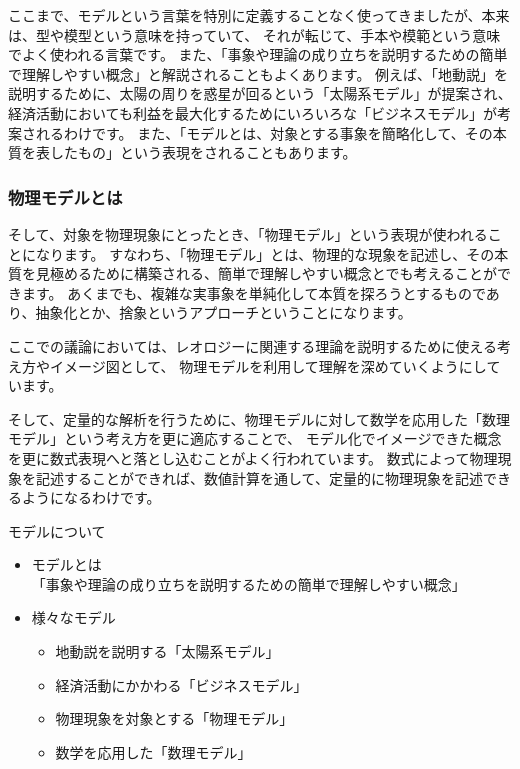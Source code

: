 \documentclass[uplatex,dvipdfmx,a4paper,11pt]{jsarticle}
\begin{document}
ここまで、モデルという言葉を特別に定義することなく使ってきましたが、本来は、型や模型という意味を持っていて、
それが転じて、手本や模範という意味でよく使われる言葉です。
また、「事象や理論の成り立ちを説明するための簡単で理解しやすい概念」と解説されることもよくあります。
例えば、「地動説」を説明するために、太陽の周りを惑星が回るという「太陽系モデル」が提案され、
経済活動においても利益を最大化するためにいろいろな「ビジネスモデル」が考案されるわけです。
また、「モデルとは、対象とする事象を簡略化して、その本質を表したもの」という表現をされることもあります。

\subsubsection{物理モデルとは}
そして、対象を物理現象にとったとき、「物理モデル」という表現が使われることになります。
すなわち、「物理モデル」とは、物理的な現象を記述し、その本質を見極めるために構築される、簡単で理解しやすい概念とでも考えることができます。
あくまでも、複雑な実事象を単純化して本質を探ろうとするものであり、抽象化とか、捨象というアプローチということになります。

ここでの議論においては、レオロジーに関連する理論を説明するために使える考え方やイメージ図として、
物理モデルを利用して理解を深めていくようにしています。

そして、定量的な解析を行うために、物理モデルに対して数学を応用した「数理モデル」という考え方を更に適応することで、
モデル化でイメージできた概念を更に数式表現へと落とし込むことがよく行われています。
数式によって物理現象を記述することができれば、数値計算を通して、定量的に物理現象を記述できるようになるわけです。
\large
\begin{itembox}[l]{モデルについて}
	\begin{itemize}
		\item モデルとは\\
		「事象や理論の成り立ちを説明するための簡単で理解しやすい概念」
		\item 様々なモデル
		\begin{itemize}
			\item 地動説を説明する「太陽系モデル」
			\item 経済活動にかかわる「ビジネスモデル」
			\item 物理現象を対象とする「物理モデル」
			\item 数学を応用した「数理モデル」
		\end{itemize}
	\end{itemize}	
\end{itembox}
\normalsize
\end{document}
